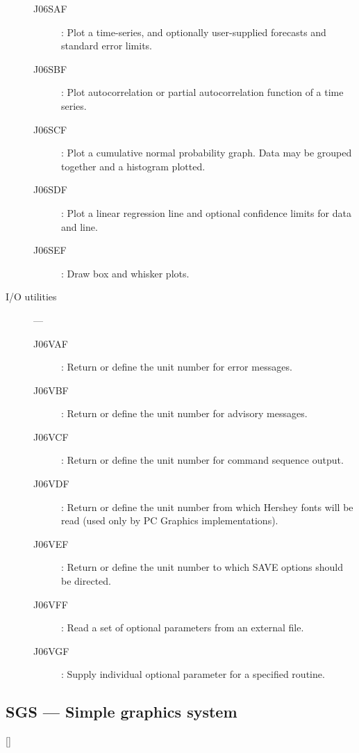 \begin{description}
\begin{description}
\item [J06SAF] : Plot a time-series, and optionally user-supplied forecasts and standard error limits.
\item [J06SBF] : Plot autocorrelation or partial autocorrelation function of a time series.
\item [J06SCF] : Plot a cumulative normal probability graph. Data may be grouped together and a histogram plotted.
\item [J06SDF] : Plot a linear regression line and optional confidence limits for data and line.
\item [J06SEF] : Draw box and whisker plots.
\end{description}

\item [I/O utilities] ---

\begin{description}
\item [J06VAF] : Return or define the unit number for error messages.
\item [J06VBF] : Return or define the unit number for advisory messages.
\item [J06VCF] : Return or define the unit number for command sequence output.
\item [J06VDF] : Return or define the unit number from which Hershey fonts will be read (used only by PC Graphics implementations).
\item [J06VEF] : Return or define the unit number to which SAVE options should be directed.
\item [J06VFF] : Read a set of optional parameters from an external file.
\item [J06VGF] : Supply individual optional parameter for a specified routine.
\end{description}

\end{description}

\newpage

\subsection{SGS --- Simple graphics system} 

\vspace{-9mm}

\hfill []

\vspace{2mm}

